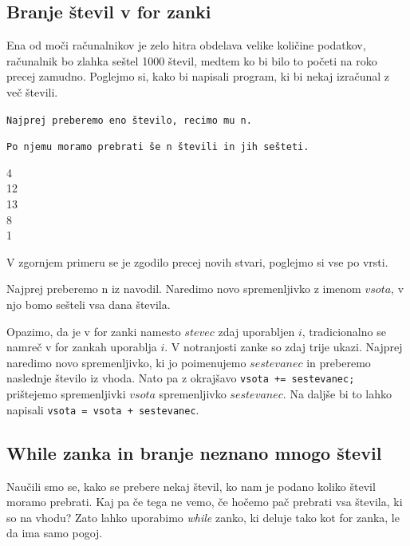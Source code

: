 \documentclass{book}
\begin{document}
\subsection{Branje števil v for zanki}

Ena od moči računalnikov je zelo hitra obdelava velike količine podatkov,
računalnik bo zlahka seštel 1000 števil, medtem ko bi bilo to početi na roko
precej zamudno. Poglejmo si, kako bi napisali program, ki bi nekaj izračunal z
več števili.

\begin{examples}
\verb+Najprej preberemo eno število, recimo mu n.+

\verb+Po njemu moramo prebrati še n števili in jih sešteti.+


\begin{inout}
	4  \\
	12 \\
	13 \\
	8  \\
	1
\end{inout}

\end{examples}

V zgornjem primeru se je zgodilo precej novih stvari, poglejmo si vse po vrsti.

Najprej preberemo n iz navodil. Naredimo novo spremenljivko z imenom $vsota$, v njo
bomo sešteli vsa dana števila.

Opazimo, da je v for zanki namesto $stevec$ zdaj uporabljen $i$, tradicionalno
se namreč v for zankah uporablja $i$.
V notranjosti zanke so zdaj trije ukazi. Najprej naredimo novo
spremenljivko, ki jo poimenujemo $sestevanec$ in preberemo naslednje
število iz vhoda. Nato pa z okrajšavo \texttt{vsota~+=~sestevanec;} prištejemo
spremenljivki $vsota$ spremenljivko $sestevanec$. Na daljše bi to lahko napisali
\texttt{vsota~=~vsota~+~sestevanec}.

\subsection{While zanka in branje neznano mnogo števil}

Naučili smo se, kako se prebere nekaj števil, ko nam je podano koliko števil
moramo prebrati. Kaj pa če tega ne vemo, če hočemo pač prebrati vsa števila,
ki so na vhodu? Zato lahko uporabimo \emph{while} zanko, ki deluje tako kot
for zanka, le da ima samo pogoj.
\end{document}
